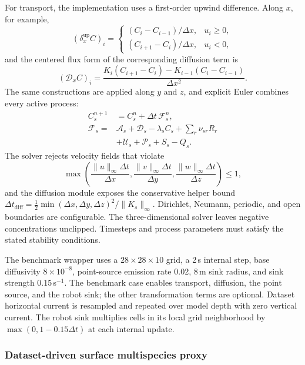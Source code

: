 For transport, the implementation uses a first-order upwind difference. Along $x$, for example,
\begin{equation}
(\delta_x^{\mathrm{up}}C)_i=
\begin{cases}
(C_i-C_{i-1})/\Delta x, & u_i\geq0,\\
(C_{i+1}-C_i)/\Delta x, & u_i<0,
\end{cases}
\label{eq:pollution_upwind}
\end{equation}
and the centered flux form of the corresponding diffusion term is
\begin{equation}
(\mathcal D_x C)_i=
\frac{K_i(C_{i+1}-C_i)-K_{i-1}(C_i-C_{i-1})}{\Delta x^2}.
\label{eq:pollution_centered_diffusion}
\end{equation}
The same constructions are applied along $y$ and $z$, and explicit Euler combines every active process:
\begin{align}
C_s^{n+1}&=C_s^n+\Delta t\,\mathcal F_s^n,
\label{eq:pollution_euler}\\
\mathcal F_s={}&\mathcal A_s+\mathcal D_s-\lambda_sC_s
+\sum_r\nu_{sr}R_r \nonumber\\
&+\mathcal U_s+\mathcal P_s+S_s-Q_s . \nonumber
\end{align}
The solver rejects velocity fields that violate
\begin{equation}
\max\!\left(
\frac{\|u\|_\infty\Delta t}{\Delta x},
\frac{\|v\|_\infty\Delta t}{\Delta y},
\frac{\|w\|_\infty\Delta t}{\Delta z}
\right)\leq1,
\label{eq:pollution_cfl}
\end{equation}
and the diffusion module exposes the conservative helper bound $\Delta t_{\mathrm{diff}}=\tfrac12\min(\Delta x,\Delta y,\Delta z)^2/\|K_s\|_\infty$. Dirichlet, Neumann, periodic, and open boundaries are configurable. The three-dimensional solver leaves negative concentrations unclipped. Timesteps and process parameters must satisfy the stated stability conditions.

The benchmark wrapper uses a $28\times28\times10$ grid, a 2\,s internal step, base diffusivity $8\times10^{-8}$, point-source emission rate 0.02, 8\,m sink radius, and sink strength 0.15\,s$^{-1}$. The benchmark case enables transport, diffusion, the point source, and the robot sink; the other transformation terms are optional. Dataset horizontal current is resampled and repeated over model depth with zero vertical current. The robot sink multiplies cells in its local grid neighborhood by $\max(0,1-0.15\Delta t)$ at each internal update.

\subsubsection{Dataset-driven surface multispecies proxy}

